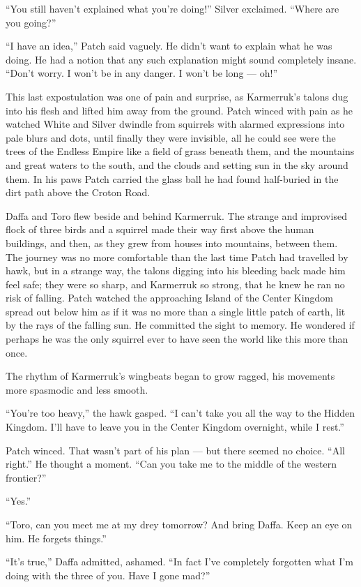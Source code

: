 \documentclass[ebook,oneside,openany,12pt]{memoir}
\begin{document}
“You still haven’t explained what you’re doing!” Silver
exclaimed. “Where are you going?”

“I have an idea,” Patch said vaguely. He didn’t want to explain what
he was doing. He had a notion that any such explanation might sound
completely insane. “Don’t worry. I won’t be in any danger. I won’t be
long — oh!”

This last expostulation was one of pain and surprise, as Karmerruk’s
talons dug into his flesh and lifted him away from the ground. Patch
winced with pain as he watched White and Silver dwindle from squirrels
with alarmed expressions into pale blurs and dots, until finally they
were invisible, all he could see were the trees of the Endless Empire
like a field of grass beneath them, and the mountains and great waters
to the south, and the clouds and setting sun in the sky around
them. In his paws Patch carried the glass ball he had found
half-buried in the dirt path above the Croton Road.

Daffa and Toro flew beside and behind Karmerruk. The strange and
improvised flock of three birds and a squirrel made their way first
above the human buildings, and then, as they grew from houses into
mountains, between them. The journey was no more comfortable than the
last time Patch had travelled by hawk, but in a strange way, the
talons digging into his bleeding back made him feel safe; they were so
sharp, and Karmerruk so strong, that he knew he ran no risk of
falling. Patch watched the approaching Island of the Center Kingdom
spread out below him as if it was no more than a single little patch
of earth, lit by the rays of the falling sun. He committed the sight
to memory. He wondered if perhaps he was the only squirrel ever to
have seen the world like this more than once.

The rhythm of Karmerruk’s wingbeats began to grow ragged, his
movements more spasmodic and less smooth.

“You’re too heavy,” the hawk gasped. “I can’t take you all the way to
the Hidden Kingdom. I’ll have to leave you in the Center Kingdom
overnight, while I rest.”

Patch winced. That wasn’t part of his plan — but there seemed no
choice. “All right.” He thought a moment. “Can you take me to the
middle of the western frontier?”

“Yes.”

“Toro, can you meet me at my drey tomorrow? And bring Daffa. Keep an
eye on him. He forgets things.”

“It’s true,” Daffa admitted, ashamed. “In fact I’ve completely
forgotten what I’m doing with the three of you. Have I gone mad?”
\end{document}
